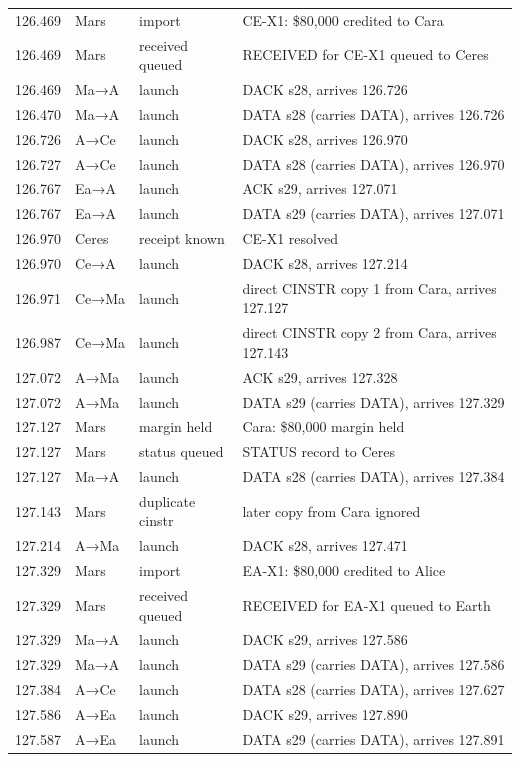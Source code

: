 \documentclass[10pt,letterpaper]{article}
\begin{document}
{\begin{longtable}{@{}rll>{\raggedright\arraybackslash}p{8.2cm}@{}}
126.469 & Mars & import & CE-X1: \$80,000 credited to Cara \\
126.469 & Mars & received queued & RECEIVED for CE-X1 queued to Ceres \\
126.469 & Ma→A & launch & DACK s28, arrives 126.726 \\
126.470 & Ma→A & launch & DATA s28 (carries DATA), arrives 126.726 \\
126.726 & A→Ce & launch & DACK s28, arrives 126.970 \\
126.727 & A→Ce & launch & DATA s28 (carries DATA), arrives 126.970 \\
126.767 & Ea→A & launch & ACK s29, arrives 127.071 \\
126.767 & Ea→A & launch & DATA s29 (carries DATA), arrives 127.071 \\
126.970 & Ceres & receipt known & CE-X1 resolved \\
126.970 & Ce→A & launch & DACK s28, arrives 127.214 \\
126.971 & Ce→Ma & launch & direct CINSTR copy 1 from Cara, arrives 127.127 \\
126.987 & Ce→Ma & launch & direct CINSTR copy 2 from Cara, arrives 127.143 \\
127.072 & A→Ma & launch & ACK s29, arrives 127.328 \\
127.072 & A→Ma & launch & DATA s29 (carries DATA), arrives 127.329 \\
127.127 & Mars & margin held & Cara: \$80,000 margin held \\
127.127 & Mars & status queued & STATUS record to Ceres \\
127.127 & Ma→A & launch & DATA s28 (carries DATA), arrives 127.384 \\
127.143 & Mars & duplicate cinstr & later copy from Cara ignored \\
127.214 & A→Ma & launch & DACK s28, arrives 127.471 \\
127.329 & Mars & import & EA-X1: \$80,000 credited to Alice \\
127.329 & Mars & received queued & RECEIVED for EA-X1 queued to Earth \\
127.329 & Ma→A & launch & DACK s29, arrives 127.586 \\
127.329 & Ma→A & launch & DATA s29 (carries DATA), arrives 127.586 \\
127.384 & A→Ce & launch & DATA s28 (carries DATA), arrives 127.627 \\
127.586 & A→Ea & launch & DACK s29, arrives 127.890 \\
127.587 & A→Ea & launch & DATA s29 (carries DATA), arrives 127.891 \\

\end{longtable}}
\end{document}
